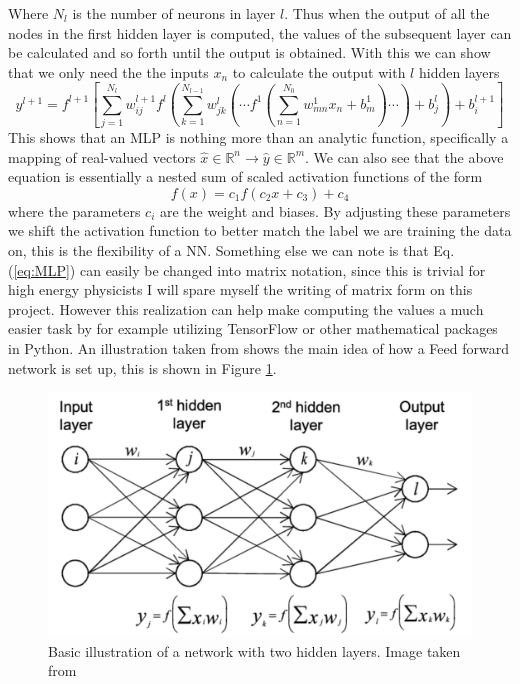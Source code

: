 \documentclass[14pt, a4paper]{book}
\begin{document}
Where $N_l$ is the number of neurons in layer $l$. Thus when the output of all the nodes in the first hidden layer is computed, the values of the subsequent layer can be calculated and so forth until the output is obtained. With this we can show that we only need the the inputs $x_n$ to calculate the output with $l$ hidden layers
\begin{equation}\label{eq:MLP}
    y^{l+1}=f^{l+1}\left[\sum_{j=1}^{N_l}w^{l+1}_{ij}f^l\left(\sum_{k=1}^{N_{l-1}}w^{l}_{jk}\left(\cdots f^{1}\left(\sum_{n=1}^{N_0}w^1_{mn}x_n+b_m^1\right)\cdots\right)+b_j^{l}\right)+b^{l+1}_i   \right]
\end{equation}
This shows that an MLP is nothing more than an analytic function, specifically a mapping of real-valued vectors $\hat{x}\in\mathbb{R}^n\rightarrow\hat{y}\in\mathbb{R}^m$. We can also see that the above equation is essentially a nested sum of scaled activation functions of the form
$$
  f(x)=c_1f(c_2x+c_3)+c_4  
$$
where the parameters $c_i$ are the weight and biases. By adjusting these parameters we shift the activation function to better match the label we are training the data on, this is the flexibility of a NN. Something else we can note is that Eq. (\ref{eq:MLP}) can easily be changed into matrix notation, since this is trivial for high energy physicists I will spare myself the writing of matrix form on this project. However this realization can help make computing the values a much easier task by for example utilizing TensorFlow or other mathematical packages in Python. An illustration taken from \cite{MORTYY1} shows the main idea of how a Feed forward network is set up, this is shown in Figure \ref{fig:NN}.
\begin{figure}[!ht]
    \centering
    \includegraphics[width=0.5\linewidth]{NN.png}
    \caption[Basic Neural Network Illustration]{Basic illustration of a network with two hidden layers. Image taken from \cite{MORTYY1}}
    \label{fig:NN}
\end{figure}
\end{document}
